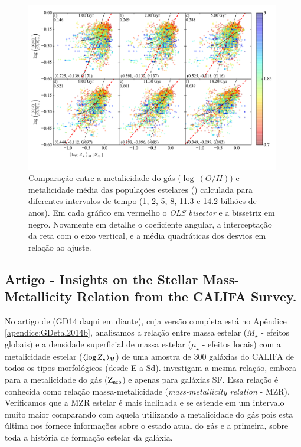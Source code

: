 \begin{figure}
	\centering
	\includegraphics[width=0.99\textwidth]{figuras/CompareZR.pdf}
	\caption[ vs. $\log\ (O/H)$ - perfis radiais]
	{Comparação entre a metalicidade do gás ($\log\ (O/H)$) e metalicidade média das populações
estelares () calculada para diferentes intervalos de tempo (1, 2, 5, 8, 11.3 e
14.2 bilhões de anos). Em cada gráfico em vermelho o {\em OLS bisector} e a bissetriz em negro.
Novamente em detalhe o coeficiente angular, a interceptação da reta com o eixo vertical, e a média
quadráticas dos desvios em relação ao ajuste.}
	\label{fig:compareZR}
\end{figure}


\subsection{Artigo - Insights on the Stellar Mass-Metallicity Relation from the CALIFA Survey.}

No artigo de \citet{GonzalezDelgado.etal.2014b} (GD14 daqui em diante), cuja versão completa está no
Apêndice \ref{apendice:GDetal2014b}, analisamos a relação entre massa estelar ($M_\star$ - efeitos
globais) e a densidade superficial de massa estelar ($\mu_\star$ - efeitos locais) com a
metalicidade estelar ($\meanM{\log Z_\star}$) de uma amostra de 300 galáxias do CALIFA de todos os
tipos morfológicos (desde E a Sd). \citet{Tremonti.etal.2004a} investigam a mesma relação, embora
para a metalicidade do gás ($\mathrm{Z}_{\mathrm{neb}}$) e apenas para galáxias SF. Essa relação é conhecida como relação
massa-metalicidade ({\em mass-metallicity relation} - MZR). Verificamos que a MZR estelar é mais
inclinada e se estende em um intervalo muito maior comparando com aquela utilizando a metalicidade
do gás pois esta última nos fornece informações sobre o estado atual do gás e a primeira, sobre toda
a história de formação estelar da galáxia. 

